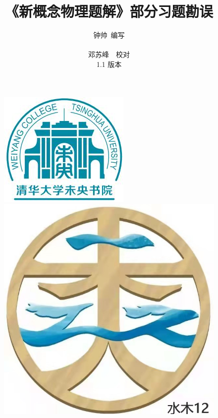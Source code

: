\documentclass[a4paper,11pt]{ctexart}
\title{\Huge\textbf{《新概念物理题解》部分习题勘误}}
\author{钟帅\ 编写 \\\\ 邓苏峰\ \  校对\\ 1.1 版本}
\begin{document}
\maketitle

\begin{figure}[b]
    \centering
\begin{minipage}[t]{0.48\textwidth}
    \centering
    \includegraphics[scale=1.55]{wy.jpg}    
\end{minipage}
\begin{minipage}[t]{0.48\textwidth}
    \centering
    \includegraphics[scale=0.31]{无标题.jpg}    
\end{minipage}

\end{figure}

\end{document}
